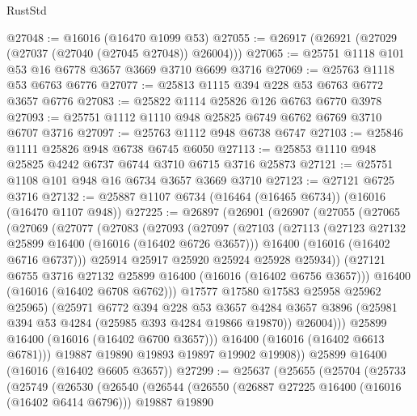 \begin{lexlean}{RustStd}
\begin{coremodule}
@27048 := @16016 (@16470 @1099 @53)
@27055 := @26917 (@26921 (@27029 (@27037 (@27040 (@27045 @27048)) @26004)))
@27065 := @25751 @1118 @101 @53 @16 @6778 @3657 @3669 @3710 @6699 @3716
@27069 := @25763 @1118 @53 @6763 @6776
@27077 := @25813 @1115 @394 @228 @53 @6763 @6772 @3657 @6776
@27083 := @25822 @1114 @25826 @126 @6763 @6770 @3978
@27093 := @25751 @1112 @1110 @948 @25825 @6749 @6762 @6769 @3710 @6707 @3716
@27097 := @25763 @1112 @948 @6738 @6747
@27103 := @25846 @1111 @25826 @948 @6738 @6745 @6050
@27113 := @25853 @1110 @948 @25825 @4242 @6737 @6744 @3710 @6715 @3716 @25873
@27121 := @25751 @1108 @101 @948 @16 @6734 @3657 @3669 @3710
@27123 := @27121 @6725 @3716
@27132 := @25887 @1107 @6734 (@16464 (@16465 @6734)) (@16016 (@16470 @1107 @948))
@27225 := @26897
    (@26901
      (@26907
        (@27055
          (@27065
            (@27069
              (@27077
                (@27083
                  (@27093
                    (@27097
                      (@27103
                        (@27113
                          (@27123 @27132 @25899 @16400 (@16016 (@16402 @6726 @3657)))
                          @16400
                          (@16016 (@16402 @6716 @6737)))
                        @25914
                        @25917
                        @25920
                        @25924
                        @25928
                        @25934))
                    (@27121 @6755 @3716 @27132 @25899 @16400 (@16016 (@16402 @6756 @3657)))
                    @16400
                    (@16016 (@16402 @6708 @6762)))
                  @17577
                  @17580
                  @17583
                  @25958
                  @25962
                  @25965)
                (@25971
                  @6772
                  @394
                  @228
                  @53
                  @3657
                  @4284
                  @3657
                  @3896
                  (@25981 @394 @53 @4284 (@25985 @393 @4284 @19866 @19870))
                  @26004)))
            @25899
            @16400
            (@16016 (@16402 @6700 @3657)))
          @16400
          (@16016 (@16402 @6613 @6781)))
        @19887
        @19890
        @19893
        @19897
        @19902
        @19908))
    @25899
    @16400
    (@16016 (@16402 @6605 @3657))
@27299 := @25637
    (@25655
      (@25704
        (@25733
          (@25749
            (@26530
              (@26540
                (@26544
                  (@26550
                    (@26887 @27225 @16400 (@16016 (@16402 @6414 @6796)))
                    @19887
                    @19890

\end{coremodule}
\end{lexlean}
